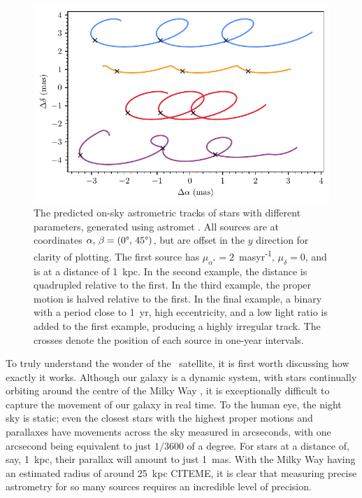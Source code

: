 \begin{figure}[tb]
	\includegraphics[width=\textwidth]{fig/c1/tracks.pdf}
	\caption[The predicted on-sky astrometric tracks of stars with different parameters]{The predicted on-sky astrometric tracks of stars with different parameters, generated using astromet \citep{penoyre_astrometric_2022}. All sources are at coordinates $\alpha,\,\beta=(0\degree,\,45\degree)$, but are offset in the $y$ direction for clarity of plotting. The first source has $\mu_{\alpha^*}=2$~masyr\textsuperscript{-1}, $\mu_{\delta}=0$, and is at a distance of 1~kpc. In the second example, the distance is quadrupled relative to the first. In the third example, the proper motion is halved relative to the first. In the final example, a binary with a period close to 1~yr, high eccentricity, and a low light ratio is added to the first example, producing a highly irregular track. The crosses denote the position of each source in one-year intervals.}
	\label{fig:intro:history:gaia_tracks}
\end{figure}

To truly understand the wonder of the \gaia\ satellite, it is first worth discussing how exactly it works. Although our galaxy is a dynamic system, with stars continually orbiting around the centre of the Milky Way \citep{binney_galactic_1987}, it is exceptionally difficult to capture the movement of our galaxy in real time. To the human eye, the night sky is static; even the closest stars with the highest proper motions and parallaxes have movements across the sky measured in arcseconds, with one arcsecond being equivalent to just $1/3600$ of a degree. For stars at a distance of, say, 1~kpc, their parallax will amount to just 1~mas. With the Milky Way having an estimated radius of around 25~kpc CITEME, it is clear that measuring precise astrometry for so many sources requires an incredible level of precision.

